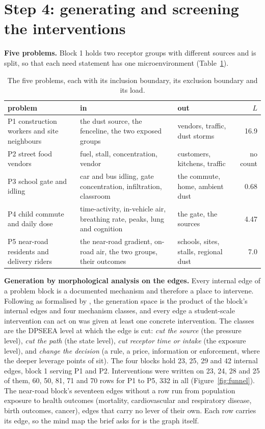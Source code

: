 \documentclass[10pt,a4paper]{article}
\begin{document}
\section{Step 4: generating and screening the interventions}\label{sec:funnel}
\textbf{Five problems.} Block 1 holds two receptor groups with different sources and is split, so that each need statement has one microenvironment (Table~\ref{tab:problems}).

\begin{table}[t]\centering\small
\caption{The five problems, each with its inclusion boundary, its exclusion boundary and its load.}\label{tab:problems}
\footnotesize\begin{tabular}{@{}lp{4.4cm}p{3.4cm}r@{}}\toprule
problem & in & out & \(L\)\\ \midrule
P1 construction workers and site neighbours & the dust source, the fenceline, the two exposed groups & vendors, traffic, dust storms & 16.9\\
P2 street food vendors & fuel, stall, concentration, vendor & customers, kitchens, traffic & no count\\
P3 school gate and idling & car and bus idling, gate concentration, infiltration, classroom & the commute, home, ambient dust & 0.68\\
P4 child commute and daily dose & time-activity, in-vehicle air, breathing rate, peaks, lung and cognition & the gate, the sources & 4.47\\
P5 near-road residents and delivery riders & the near-road gradient, on-road air, the two groups, their outcomes & schools, sites, stalls, regional dust & 7.0\\
\bottomrule\end{tabular}\end{table}

\textbf{Generation by morphological analysis on the edges.} Every internal edge of a problem block is a documented mechanism and therefore a place to intervene. Following \citet{Zwicky1969} as formalised by \citet{Ritchey2006}, the generation space is the product of the block's internal edges and four mechanism classes, and every edge a student-scale intervention can act on was given at least one concrete intervention. The classes are the DPSEEA level at which the edge is cut: \emph{cut the source} (the pressure level), \emph{cut the path} (the state level), \emph{cut receptor time or intake} (the exposure level), and \emph{change the decision} (a rule, a price, information or enforcement, where the deeper leverage points of \citet{Meadows1999} sit). The four blocks hold 23, 25, 29 and 42 internal edges, block 1 serving P1 and P2. Interventions were written on 23, 24, 28 and 25 of them, 60, 50, 81, 71 and 70 rows for P1 to P5, 332 in all (Figure~\ref{fig:funnel}). The near-road block's seventeen edges without a row run from population exposure to health outcomes (mortality, cardiovascular and respiratory disease, birth outcomes, cancer), edges that carry no lever of their own. Each row carries its edge, so the mind map the brief asks for is the graph itself.
\end{document}
